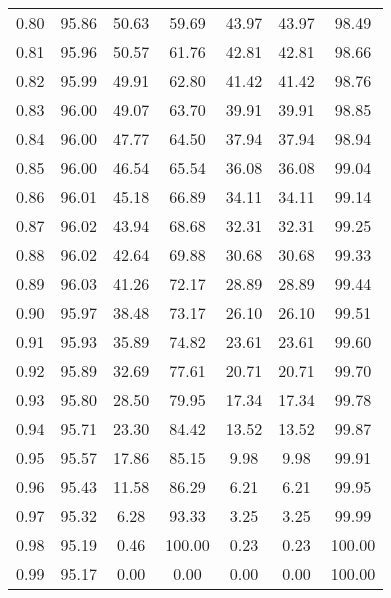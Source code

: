 \begin{tabular}{|c|c|c|c|c|c|c|}
      0.80 &     95.86 &     50.63 &      59.69 &   43.97 &      43.97 &         98.49 \\
      0.81 &     95.96 &     50.57 &      61.76 &   42.81 &      42.81 &         98.66 \\
      0.82 &     95.99 &     49.91 &      62.80 &   41.42 &      41.42 &         98.76 \\
      0.83 &     96.00 &     49.07 &      63.70 &   39.91 &      39.91 &         98.85 \\
      0.84 &     96.00 &     47.77 &      64.50 &   37.94 &      37.94 &         98.94 \\
      0.85 &     96.00 &     46.54 &      65.54 &   36.08 &      36.08 &         99.04 \\
      0.86 &     96.01 &     45.18 &      66.89 &   34.11 &      34.11 &         99.14 \\
      0.87 &     96.02 &     43.94 &      68.68 &   32.31 &      32.31 &         99.25 \\
      0.88 &     96.02 &     42.64 &      69.88 &   30.68 &      30.68 &         99.33 \\
      0.89 &     96.03 &     41.26 &      72.17 &   28.89 &      28.89 &         99.44 \\
      0.90 &     95.97 &     38.48 &      73.17 &   26.10 &      26.10 &         99.51 \\
      0.91 &     95.93 &     35.89 &      74.82 &   23.61 &      23.61 &         99.60 \\
      0.92 &     95.89 &     32.69 &      77.61 &   20.71 &      20.71 &         99.70 \\
      0.93 &     95.80 &     28.50 &      79.95 &   17.34 &      17.34 &         99.78 \\
      0.94 &     95.71 &     23.30 &      84.42 &   13.52 &      13.52 &         99.87 \\
      0.95 &     95.57 &     17.86 &      85.15 &    9.98 &       9.98 &         99.91 \\
      0.96 &     95.43 &     11.58 &      86.29 &    6.21 &       6.21 &         99.95 \\
      0.97 &     95.32 &      6.28 &      93.33 &    3.25 &       3.25 &         99.99 \\
      0.98 &     95.19 &      0.46 &     100.00 &    0.23 &       0.23 &        100.00 \\
      0.99 &     95.17 &      0.00 &       0.00 &    0.00 &       0.00 &        100.00 \\
\bottomrule
\end{tabular}
